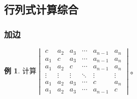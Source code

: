 \documentclass[10pt, a4paper, oneside, fontset=none]{ctexart}
\theoremstyle{plain}
\theoremstyle{definition}
\newtheorem{example}[theorem]{例}
\begin{document}
\subsection{行列式计算综合}
\subsubsection{加边}
\begin{example}
    计算$\begin{vmatrix}
        c&a_2&a_3&\cdots&a_{n-1}&a_n\\
        a_1&c&a_3&\cdots&a_{n-1}&a_n\\
        a_1&a_2&c&\cdots&a_{n-1}&a_n\\
        \vdots&\vdots&\vdots&\ddots&\vdots&\vdots\\
        a_1&a_2&a_3&\cdots&c&a_n\\
        a_1&a_2&a_3&\cdots&a_{n-1}&c
    \end{vmatrix}$。
\end{example}
\end{document}
